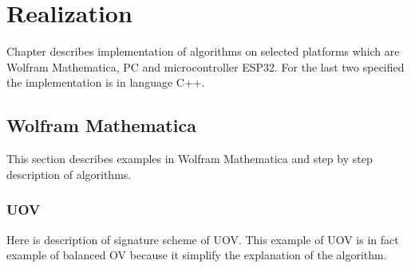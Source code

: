 \documentclass[thesis=M,english]{FITthesis}[2019/12/23]
\begin{document}
\chapter{Realization}
Chapter describes implementation of algorithms on selected platforms which are Wolfram Mathematica, PC and microcontroller ESP32. For the last two specified the implementation is in language C++.

\section{Wolfram Mathematica}
This section describes examples in Wolfram Mathematica and step by step description of algorithms.

\subsection{UOV}
Here is description of signature scheme of UOV. This example of UOV is in fact example of balanced OV because it simplify the explanation of the algorithm.
\end{document}
